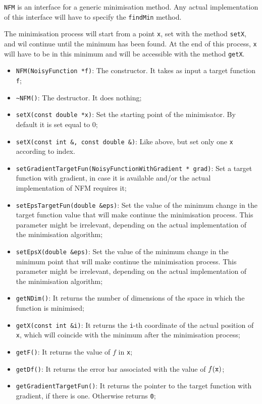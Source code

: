 \documentclass[11pt,a4paper,twoside]{article}
\begin{document}
\verb+NFM+ is an interface for a generic minimisation method.
Any actual implementation of this interface will have to specify the \verb+findMin+ method.

The minimisation process will start from a point \verb+x+, set with the method \verb+setX+, and wil continue until the minimum has been found.
At the end of this process, \verb+x+ will have to be in this minimum and will be accessible with the method \verb+getX+.

\begin{itemize}
   \item \verb+NFM(NoisyFunction *f)+: The constructor. It takes as input a target function \verb+f+;
   \item \verb+~NFM()+: The destructor. It does nothing;
   \item \verb+setX(const double *x)+: Set the starting point of the minimisator. By default it is set equal to $0$;
   \item \verb+setX(const int &, const double &)+: Like above, but set only one \verb+x+ according to index.
   \item \verb+setGradientTargetFun(NoisyFunctionWithGradient * grad)+: Set a target function with gradient, in case it is available and/or the actual implementation of NFM requires it;
   \item \verb+setEpsTargetFun(double &eps)+: Set the value of the minimum change in the target function value that will make continue the minimisation process. This parameter might be irrelevant, depending on the actual implementation of the minimisation algorithm;
   \item \verb+setEpsX(double &eps)+: Set the value of the minimum change in the minimum point that will make continue the minimisation process. This parameter might be irrelevant, depending on the actual implementation of the minimisation algorithm;
   \item \verb+getNDim()+: It returns the number of dimensions of the space in which the function is minimised;
   \item \verb+getX(const int &i)+: It returns the \verb+i+-th coordinate of the actual position of \verb+x+, which will coincide with the minimum after the minimisation process;
   \item \verb+getF()+: It returns the value of $f$ in \verb+x+;
   \item \verb+getDf()+: It returns the error bar associated with the value of $f(\verb+x+)$;
   \item \verb+getGradientTargetFun()+: It returns the pointer to the target function with gradient, if there is one. Otherwise returns \verb+0+;

\end{itemize}
\end{document}
